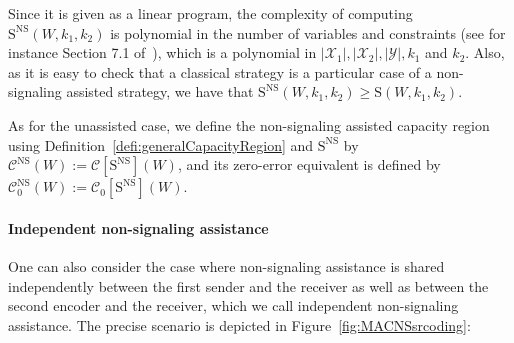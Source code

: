 Since it is given as a linear program, the complexity of computing $\mathrm{S}^{\mathrm{NS}}(W,k_1,k_2)$ is polynomial in the number of variables and constraints (see for instance Section 7.1 of~\cite{GM07}), which is a polynomial in $|\mathcal{X}_1|,|\mathcal{X}_2|,|\mathcal{Y}|,k_1$ and $k_2$. Also, as it is easy to check that a classical strategy is a particular case of a non-signaling assisted strategy, we have that $\mathrm{S}^{\mathrm{NS}}(W,k_1,k_2) \geq \mathrm{S}(W,k_1,k_2)$.



As for the unassisted case, we define the non-signaling assisted capacity region using Definition~\ref{defi:generalCapacityRegion} and $\mathrm{S}^{\mathrm{NS}}$ by $\mathcal{C}^{\mathrm{NS}}(W) := \mathcal{C}[\mathrm{S}^{\mathrm{NS}}](W)$, and its zero-error equivalent is defined by $\mathcal{C}^{\mathrm{NS}}_0(W) := \mathcal{C}_0[\mathrm{S}^{\mathrm{NS}}](W)$.

\paragraph{Independent non-signaling assistance} One can also consider the case where non-signaling assistance is shared independently between the first sender and the receiver as well as between the second encoder and the receiver, which we call independent non-signaling assistance. The precise scenario is depicted in Figure~\ref{fig:MACNSsrcoding}:

